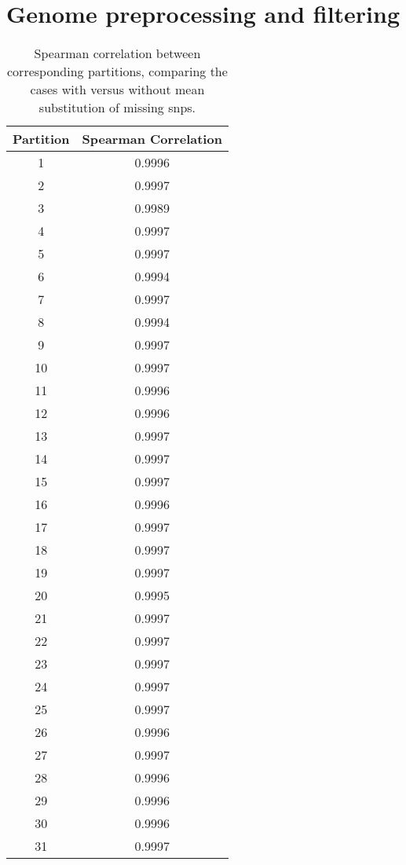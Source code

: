 \appendix
\chapter{Genome preprocessing and filtering}

\begin{table}[!htp]\centering
	\scriptsize
	\begin{tabular}{cc}\toprule
		\textbf{Partition} &\textbf{Spearman Correlation} \\\midrule
		1 &0.9996 \\
		2 &0.9997 \\
		3 &0.9989 \\
		4 &0.9997 \\
		5 &0.9997 \\
		6 &0.9994 \\
		7 &0.9997 \\
		8 &0.9994 \\
		9 &0.9997 \\
		10 &0.9997 \\
		11 &0.9996 \\
		12 &0.9996 \\
		13 &0.9997 \\
		14 &0.9997 \\
		15 &0.9997 \\
		16 &0.9996 \\
		17 &0.9997 \\
		18 &0.9997 \\
		19 &0.9997 \\
		20 &0.9995 \\
		21 &0.9997 \\
		22 &0.9997 \\
		23 &0.9997 \\
		24 &0.9997 \\
		25 &0.9997 \\
		26 &0.9996 \\
		27 &0.9997 \\
		28 &0.9996 \\
		29 &0.9996 \\
		30 &0.9996 \\
		31 &0.9997 \\
		\bottomrule
	\end{tabular}
\caption[Spearman correlation assessing mean substitution effect]{Spearman correlation between corresponding partitions, comparing the cases with versus without mean substitution of missing \acp{snp}.}
\label{tab: spearman_no_vs_mean}
\end{table}

